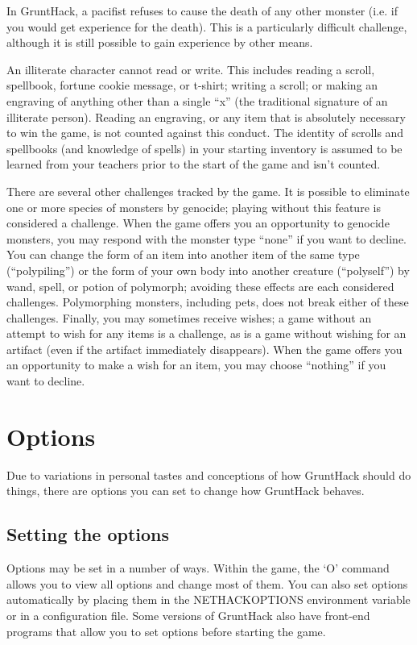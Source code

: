 In GruntHack, a pacifist refuses to cause the death of any other monster
(i.e. if you would get experience for the death).  This is a particularly
difficult challenge, although it is still possible to gain experience
by other means.

An illiterate character cannot read or write.  This includes reading
a scroll, spellbook, fortune cookie message, or t-shirt; writing a
scroll; or making an engraving of anything other than a single ``x'' (the
traditional signature of an illiterate person).  Reading an engraving,
or any item that is absolutely necessary to win the game, is not counted
against this conduct.  The identity of scrolls and spellbooks (and
knowledge of spells) in your starting inventory is assumed to be
learned from your teachers prior to the start of the game and isn't
counted.

There are several other challenges tracked by the game.  It is possible
to eliminate one or more species of monsters by genocide; playing without
this feature is considered a challenge.  When the game offers you an
opportunity to genocide monsters, you may respond with the monster type
``none'' if you want to decline.  You can change the form of an item into
another item of the same type (``polypiling'') or the form of your own
body into another creature (``polyself'') by wand, spell, or potion of
polymorph; avoiding these effects are each considered challenges.
Polymorphing monsters, including pets, does not break either of these
challenges.
Finally, you may sometimes receive wishes; a game without an attempt to
wish for any items is a challenge, as is a game without wishing for
an artifact (even if the artifact immediately disappears).  When the
game offers you an opportunity to make a wish for an item, you may
choose ``nothing'' if you want to decline.

\section{Options}

Due to variations in personal tastes and conceptions of how GruntHack
should do things, there are options you can set to change how GruntHack
behaves.
\subsection*{Setting the options}

Options may be set in a number of ways.  Within the game, the `O'
command allows you to view all options and change most of them.
You can also set options automatically by placing them in the
NETHACKOPTIONS environment variable or in a configuration file.
Some versions of GruntHack also have front-end programs that allow
you to set options before starting the game.
